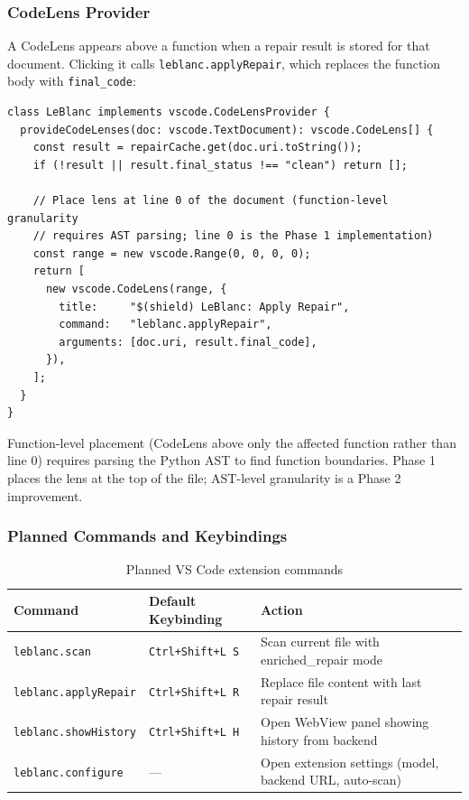 \documentclass[12pt,a4paper]{report}
\begin{document}
\subsubsection{CodeLens Provider}

A CodeLens appears above a function when a repair result is stored for that
document. Clicking it calls \texttt{leblanc.applyRepair}, which replaces the
function body with \texttt{final\_code}:

\begin{lstlisting}[language={}, caption={CodeLens provider skeleton},
                   label={lst:codelens}]
class LeBlanc implements vscode.CodeLensProvider {
  provideCodeLenses(doc: vscode.TextDocument): vscode.CodeLens[] {
    const result = repairCache.get(doc.uri.toString());
    if (!result || result.final_status !== "clean") return [];

    // Place lens at line 0 of the document (function-level granularity
    // requires AST parsing; line 0 is the Phase 1 implementation)
    const range = new vscode.Range(0, 0, 0, 0);
    return [
      new vscode.CodeLens(range, {
        title:     "$(shield) LeBlanc: Apply Repair",
        command:   "leblanc.applyRepair",
        arguments: [doc.uri, result.final_code],
      }),
    ];
  }
}
\end{lstlisting}

Function-level placement (CodeLens above only the affected function rather than
line 0) requires parsing the Python AST to find function boundaries. Phase 1
places the lens at the top of the file; AST-level granularity is a Phase 2
improvement.

\subsubsection{Planned Commands and Keybindings}

\begin{table}[H]
\centering
\caption{Planned VS Code extension commands}
\label{tab:vscodecommands}
\renewcommand{\arraystretch}{1.3}
\begin{tabularx}{\textwidth}{@{}llX@{}}
\toprule
\textbf{Command} & \textbf{Default Keybinding} & \textbf{Action} \\
\midrule
\texttt{leblanc.scan}        & \texttt{Ctrl+Shift+L S} &
  Scan current file with enriched\_repair mode \\
\texttt{leblanc.applyRepair} & \texttt{Ctrl+Shift+L R} &
  Replace file content with last repair result \\
\texttt{leblanc.showHistory} & \texttt{Ctrl+Shift+L H} &
  Open WebView panel showing history from backend \\
\texttt{leblanc.configure}   & --- &
  Open extension settings (model, backend URL, auto-scan) \\
\bottomrule
\end{tabularx}
\end{table}
\end{document}
